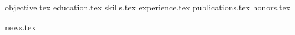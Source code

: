 \documentclass[11pt, a4paper]{awesome-cv}
\newcommand*{\sectiondir}{resume/}
\begin{document}
\makecvheader

{objective.tex}
{education.tex}
{skills.tex}
{experience.tex}
{publications.tex}
{honors.tex}

{news.tex}
\end{document}
